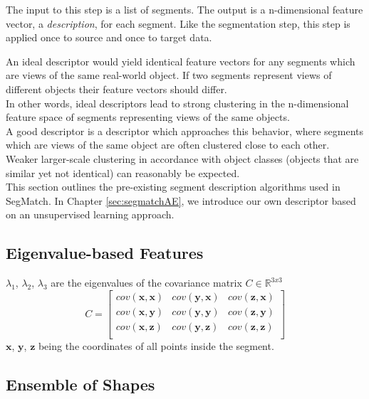 The input to this step is a list of segments. The output is a n-dimensional feature vector, a \textit{description}, for each segment. Like the segmentation step, this step is applied once to source and once to target data.

An ideal descriptor would yield identical feature vectors for any segments which are views of the same real-world object. If two segments represent views of different objects their feature vectors should differ.\\

In other words, ideal descriptors lead to strong clustering in the n-dimensional feature space of segments representing views of the same objects. \\

A good descriptor is a descriptor which approaches this behavior, where segments which are views of the same object are often clustered close to each other. Weaker larger-scale clustering in accordance with object classes (objects that are similar yet not identical) can reasonably be expected.\\

This section outlines the pre-existing segment description algorithms used in SegMatch. In Chapter \ref{sec:segmatchAE}, we introduce our own descriptor based on an unsupervised learning approach.\\

\subsection{Eigenvalue-based Features}
\label{subsec:eigenvalues}

$\lambda_1$, $\lambda_2$, $\lambda_3$ are the eigenvalues of the covariance matrix $C \in \mathbb{R}^{3x3}$
$$
C = 
\begin{bmatrix}
  cov(\textbf{x},\textbf{x}) & cov(\textbf{y},\textbf{x}) & cov(\textbf{z},\textbf{x})  \\
  cov(\textbf{x},\textbf{y}) & cov(\textbf{y},\textbf{y}) & cov(\textbf{z},\textbf{y})  \\
  cov(\textbf{x},\textbf{z}) & cov(\textbf{y},\textbf{z}) & cov(\textbf{z},\textbf{z})  \\
\end{bmatrix} 
$$
$\textbf{x}$, $\textbf{y}$, $\textbf{z}$ being the coordinates of all points inside the segment.

\subsection{Ensemble of Shapes}
\label{subsec:ensemble-of-shapes}


